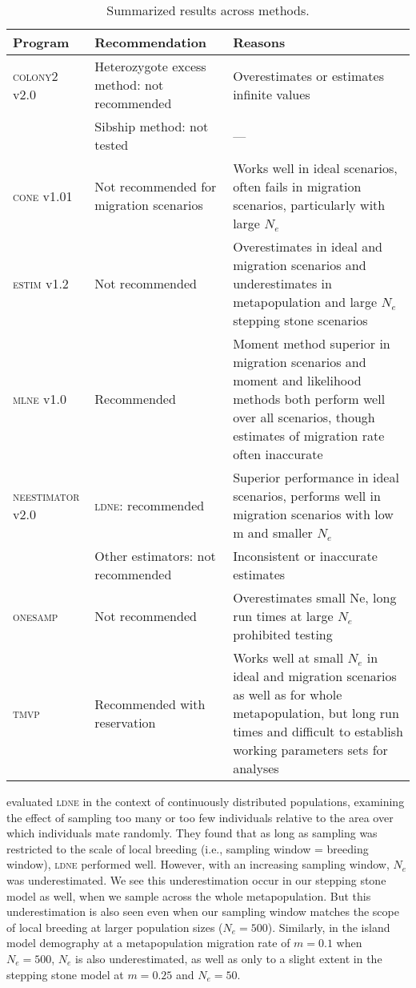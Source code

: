 \begin{table}[]
\centering \footnotesize
\caption{Summarized results across methods.}
\begin{tabular}{p{}|p{}|p{}}
\small{Program}			& \small{Recommendation}		        & \small{Reasons} \\ \hline
\textsc{colony2} v2.0 	&	Heterozygote excess method: not recommended	& Overestimates or estimates infinite values \\
						& 	Sibship method: not tested	        & --- \\ \hline
\textsc{cone} v1.01 	&	Not recommended for migration scenarios	& Works well in ideal scenarios, often fails in migration scenarios, particularly with large $N_e$ \\ \hline
\textsc{estim} v1.2 	&	Not recommended	                    & Overestimates in ideal and migration scenarios and underestimates in metapopulation and large $N_e$ stepping stone scenarios \\ \hline
\textsc{mlne} v1.0 		&	Recommended	                        & Moment method superior in migration scenarios and moment and likelihood methods both perform well over all scenarios, though estimates of migration rate often inaccurate \\ \hline
\textsc{neestimator} v2.0 	&	\textsc{ldne}: recommended      & Superior performance in ideal scenarios, performs well in migration scenarios with low m and smaller $N_e$ \\
						& 	Other estimators: not recommended	& Inconsistent or inaccurate estimates \\ \hline
\textsc{onesamp} 		&	Not recommended	                    & Overestimates small Ne, long run times at large $N_e$ prohibited testing \\ \hline 
\textsc{tmvp}			&	Recommended with reservation	    & Works well at small $N_e$ in ideal and migration scenarios as well as for whole metapopulation, but long run times and difficult to establish working parameters sets for analyses \\
\end{tabular}
\label{tab:ne-4}
\end{table}

\citet{Neel:2013} evaluated \textsc{ldne} in the context of continuously distributed populations, 
examining the effect of sampling too many or too few individuals relative to the area over which 
individuals mate randomly. They found that as long as sampling was restricted to the scale of local 
breeding (i.e., sampling window = breeding window), \textsc{ldne} performed well. However, with an 
increasing sampling window, $N_e$ was underestimated. We see this underestimation occur in 
our stepping stone model as well, when we sample across the whole metapopulation. But this 
underestimation is also seen even when our sampling window matches the scope of local breeding 
at larger population sizes ($N_e = 500$). Similarly, in the island model demography at 
a metapopulation migration rate of $m = 0.1$ when $N_e = 500$, $N_e$ is also 
underestimated, as well as only to a slight extent in the stepping stone model at $m = 0.25$ and $N_e = 50$.


